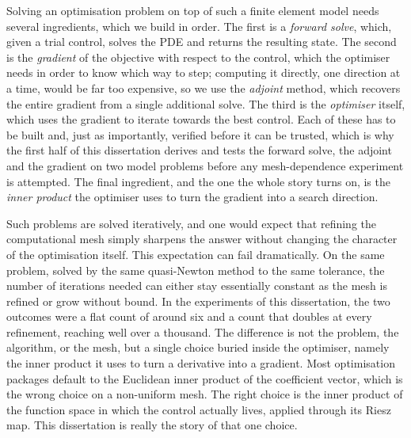 \documentclass[a4paper,11pt]{article}
\theoremstyle{spacedplain} \newtheorem{theorem}[counter]{Theorem} \newtheorem{lemma}[counter]{Lemma} \newtheorem{prop}[counter]{Proposition} \newtheorem{cor}[counter]{Corollary}
\theoremstyle{spaceddefinition} \newtheorem{defn}[counter]{Definition} \newtheorem{example}[counter]{Example} \newtheorem{remark}[counter]{Remark}
\begin{document}
Solving an optimisation problem on top of such a finite element model needs several ingredients, which we build in order. The first is a \emph{forward solve}, which, given a trial control, solves the PDE and returns the resulting state. The second is the \emph{gradient} of the objective with respect to the control, which the optimiser needs in order to know which way to step; computing it directly, one direction at a time, would be far too expensive, so we use the \emph{adjoint} method, which recovers the entire gradient from a single additional solve. The third is the \emph{optimiser} itself, which uses the gradient to iterate towards the best control. Each of these has to be built and, just as importantly, verified before it can be trusted, which is why the first half of this dissertation derives and tests the forward solve, the adjoint and the gradient on two model problems before any mesh-dependence experiment is attempted. The final ingredient, and the one the whole story turns on, is the \emph{inner product} the optimiser uses to turn the gradient into a search direction.

Such problems are solved iteratively, and one would expect that refining the computational mesh simply sharpens the answer without changing the character of the optimisation itself. This expectation can fail dramatically. On the same problem, solved by the same quasi-Newton method to the same tolerance, the number of iterations needed can either stay essentially constant as the mesh is refined or grow without bound. In the experiments of this dissertation, the two outcomes were a flat count of around six and a count that doubles at every refinement, reaching well over a thousand. The difference is not the problem, the algorithm, or the mesh, but a single choice buried inside the optimiser, namely the inner product it uses to turn a derivative into a gradient. Most optimisation packages default to the Euclidean inner product of the coefficient vector, which is the wrong choice on a non-uniform mesh. The right choice is the inner product of the function space in which the control actually lives, applied through its Riesz map. This dissertation is really the story of that one choice.
\end{document}
